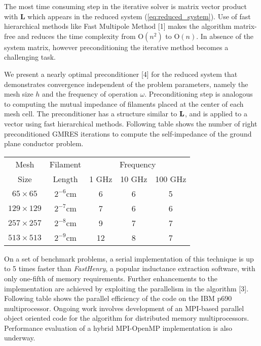 \documentclass{report}
\begin{document}
The most time consuming step in the iterative solver is matrix vector
product with {\bf L} which appears in the reduced system
(\ref{eq:reduced_system}). Use of fast hierarchical methods like Fast
Multipole Method [1] makes the algorithm matrix-free and reduces the time
complexity from O$(n^2)$ to O$(n)$. In absence of the system matrix,
however preconditioning the iterative method becomes a challenging task.

We present a nearly optimal preconditioner [4] for the reduced system
that demonstrates convergence independent of the problem parameters,
namely the mesh size $h$ and the frequency of operation $\omega$.
Preconditioning step is analogous to computing the mutual impedance of
filaments placed at the center of each mesh cell. The preconditioner has
a structure similar to ${\bf L}$, and is applied to a vector using fast
hierarchical methods. Following table shows the number of right
preconditioned GMRES iterations to compute the self-impedance of the
ground plane conductor problem.

\begin{center}
\begin{tabular}{|c|c|c|c|c|} \hline
{Mesh} & {Filament} & \multicolumn {3}{|c|}{Frequency}\\
\cline{3-5}
{Size} & {Length} & 1 GHz & 10 GHz & 100 GHz \\ \hline
$65 \times 65$ & $2^{-6}$cm & 6 & 6 & 5 \\ \hline
$129 \times 129$ & $2^{-7}$cm & 7 & 6 & 6 \\ \hline
$257 \times 257$ & $2^{-8}$cm & 9 & 7 & 7 \\ \hline
$513 \times 513$ & $2^{-9}$cm & 12 & 8 & 7 \\ \hline
\end{tabular}
\end{center}

On a set of benchmark problems, a serial implementation of this technique
is up to 5 times faster than {\it FastHenry}, a popular inductance
extraction software, with only one-fifth of memory requirements. Further
enhancements to the implementation are achieved by exploiting the
parallelism in the algorithm [3]. Following table shows the parallel
efficiency of the code on the IBM p690 multiprocessor. Ongoing work
involves development of an MPI-based parallel object oriented code for
the algorithm for distributed memory multiprocessors. Performance
evaluation of a hybrid MPI-OpenMP implementation is also underway.
\end{document}
